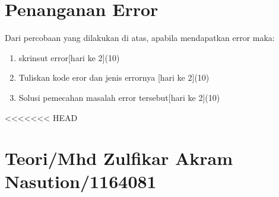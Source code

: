 \section{Penanganan Error}
Dari percobaan yang dilakukan di atas, apabila mendapatkan error maka:

\begin{enumerate}
	\item
	skrinsut error[hari ke 2](10)
	\item
Tuliskan kode eror dan jenis errornya [hari ke 2](10)
	\item
Solusi pemecahan masalah error tersebut[hari ke 2](10)

\end{enumerate}

<<<<<<< HEAD
\section{Teori/Mhd Zulfikar Akram Nasution/1164081}
